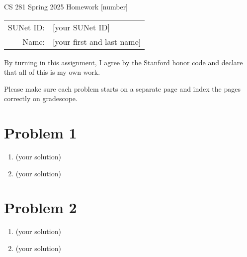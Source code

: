 \documentclass[12pt]{article}
\begin{document}
\begin{center}
{\Large CS 281 Spring 2025 Homework [number]}

\begin{tabular}{rl}
SUNet ID: & [your SUNet ID] \\
Name: & [your first and last name] \\
\end{tabular}
\end{center}

By turning in this assignment, I agree by the Stanford honor code and declare
that all of this is my own work.

Please make sure each problem starts on a separate page and index the pages correctly on gradescope.

\section*{Problem 1}

\begin{enumerate}[label=(\alph*)]
  \item (your solution)
  \item (your solution)
\end{enumerate}

\newpage
\section*{Problem 2}

\begin{enumerate}[label=(\alph*)]
  \item (your solution)
  \item (your solution)
\end{enumerate}
\end{document}
